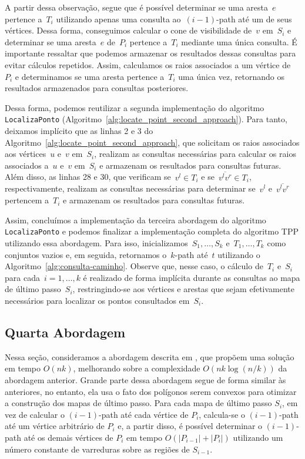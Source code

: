 \documentclass[11pt]{article}
\newcommand{\algref}[1]{\ref{#1}}
\begin{document}
A partir dessa observação, segue que é possível determinar se uma aresta~\(e\) pertence a~\(T_i\) utilizando apenas uma consulta ao~\((i - 1)\)-path até um de seus vértices. Dessa forma, conseguimos calcular o cone de visibilidade de~\(v\) em~\(S_i\) e determinar se uma aresta~\(e\) de~\(P_i\) pertence a~\(T_i\) mediante uma única consulta. É importante ressaltar que podemos armazenar os resultados dessas consultas para evitar cálculos repetidos. Assim, calculamos os raios associados a um vértice de~\(P_i\) e determinamos se uma aresta pertence a~\(T_i\) uma única vez, retornando os resultados armazenados para consultas posteriores.

Dessa forma, podemos reutilizar a segunda implementação do algoritmo \texttt{LocalizaPonto} (Algoritmo~\algref{alg:locate_point_second_approach}). Para tanto, deixamos implícito que as linhas 2 e 3 do Algoritmo~\algref{alg:locate_point_second_approach}, que solicitam os raios associados aos vértices~\(u\) e~\(v\) em~\(S_i\), realizam as consultas necessárias para calcular os raios associados a~\(u\) e~\(v\) em~\(S_i\) e armazenam os resultados para consultas futuras. Além disso, as linhas 28 e 30, que verificam se~\(v^l \in T_i\) e se~\(\overline{v^l v^r} \in T_i\), respectivamente, realizam as consultas necessárias para determinar se~\(v^l\) e~\(\overline{v^l v^r}\) pertencem a~\(T_i\) e armazenam os resultados para consultas futuras.

Assim, concluímos a implementação da terceira abordagem do algoritmo \texttt{LocalizaPonto} e podemos finalizar a implementação completa do algoritmo TPP utilizando essa abordagem. Para isso, inicializamos~\(S_1, \dots, S_k\) e~\(T_1, \dots, T_k\) como conjuntos vazios e, em seguida, retornamos o~\(k\)-path até~\(t\) utilizando o Algoritmo~\algref{alg:consulta-caminho}. Observe que, nesse caso, o cálculo de~\(T_i\) e~\(S_i\) para cada~\(i = 1, \dots, k\) é realizado de forma implícita durante as consultas ao mapa de último passo~\(S_i\), restringindo-se aos vértices e arestas que sejam efetivamente necessários para localizar os pontos consultados em~\(S_i\).

\subsection{Quarta Abordagem}

Nessa seção, consideramos a abordagem descrita em \cite{tpp-tan2017}, que propõem uma solução em tempo \(O(nk)\), melhorando sobre a complexidade \(O(nk \log(n / k))\) da abordagem anterior. Grande parte dessa abordagem segue de forma similar às anteriores, no entanto, ela usa o fato dos polígonos serem convexos para otimizar a construção dos mapas de último passo. Para cada mapa de último passo \(S_i\), em vez de calcular o \((i - 1)\)-path até cada vértice de \(P_i\), calcula-se o \((i - 1)\)-path até um vértice arbitrário de \(P_i\) e, a partir disso, é possível determinar o \((i - 1)\)-path até os demais vértices de \(P_i\) em tempo \(O(|P_{i - 1}| + |P_i|)\) utilizando um número constante de varreduras sobre as regiões de \(S_{i - 1}\).
\end{document}
